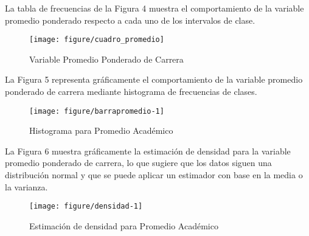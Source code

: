 \begin{itemize}
	La tabla de frecuencias de la Figura 4 muestra el comportamiento de la variable promedio ponderado respecto a cada uno de los intervalos de clase.	
	
	\begin{figure}[ht]
		\centering
		\texttt{[image: figure/cuadro\_promedio]}
		\caption{Variable Promedio Ponderado de Carrera}
		\label{fig:cuadro_promedio}
	\end{figure}
	La Figura 5 representa gráficamente el comportamiento de la variable promedio ponderado de carrera mediante histograma de frecuencias de clases.

	\begin{figure}[ht]
		\centering
\begin{kframe}
\begin{alltt}
          \hlstd{=}\hlstd{,} \hlstd{=}\hlstd{,} \hlstd{=}\hlstd{))}
\end{alltt}
\end{kframe}
\texttt{[image: figure/barrapromedio-1]} 

		\caption{Histograma para Promedio Académico}
		\label{fig:barras_promedio_frecuencias_clase}
	\end{figure}


	La Figura 6 muestra gráficamente la estimación de densidad para la variable promedio ponderado de carrera, lo que sugiere que los datos siguen una distribución normal y que se puede aplicar un estimador con base en la media o la varianza. 
	\begin{figure}[ht]
		\centering
\begin{kframe}
\begin{alltt}
        \hlstd{(} \hlopt{~}   \hlstd{=}\hlstd{,} \hlstd{=}\hlstd{,} \hlstd{=}\hlstd{,}  \hlstd{=}\hlstd{)}
\end{alltt}
\end{kframe}
\texttt{[image: figure/densidad-1]} 
\begin{kframe}\begin{alltt}
\end{alltt}
\end{kframe}
		\caption{Estimación de densidad para Promedio Académico}
		\label{fig:estimacion_frecuencia:promedio}
	\end{figure}


\end{itemize}
